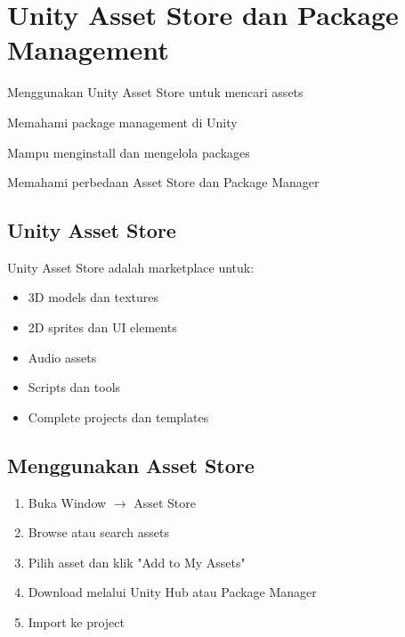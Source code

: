 
\section{Unity Asset Store dan Package Management}

\begin{learningoutcomes}
\item Menggunakan Unity Asset Store untuk mencari assets
\item Memahami package management di Unity
\item Mampu menginstall dan mengelola packages
\item Memahami perbedaan Asset Store dan Package Manager
\end{learningoutcomes}

\subsection{Unity Asset Store}

Unity Asset Store adalah marketplace untuk:
\begin{itemize}
\item 3D models dan textures
\item 2D sprites dan UI elements
\item Audio assets
\item Scripts dan tools
\item Complete projects dan templates
\end{itemize}

\subsection{Menggunakan Asset Store}

\begin{enumerate}
\item Buka Window $\rightarrow$ Asset Store
\item Browse atau search assets
\item Pilih asset dan klik "Add to My Assets"
\item Download melalui Unity Hub atau Package Manager
\item Import ke project
\end{enumerate}

